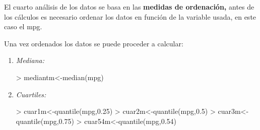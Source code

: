 \documentclass [a4paper] {article}
\begin{document}
\bigskip
El cuarto an\'alisis de los datos se basa en las \textbf{medidas de ordenaci\'on,} antes de los c\'alculos es necesario ordenar
los datos en funci\'on de la variable usada, en este caso el mpg.

\bigskip
Una vez ordenados los datos se puede proceder a calcular:

\begin{enumerate}
\item
\textit{Mediana:}
\begin{Schunk}
\begin{Sinput}
> mediantm<-median(mpg)
\end{Sinput}
\end{Schunk}

\item
\textit{Cuartiles:}
\begin{Schunk}
\begin{Sinput}
> cuar1m<-quantile(mpg,0.25)
> cuar2m<-quantile(mpg,0.5)
> cuar3m<-quantile(mpg,0.75)
> cuar54m<-quantile(mpg,0.54)
\end{Sinput}
\end{Schunk}
\end{enumerate}
\end{document}
